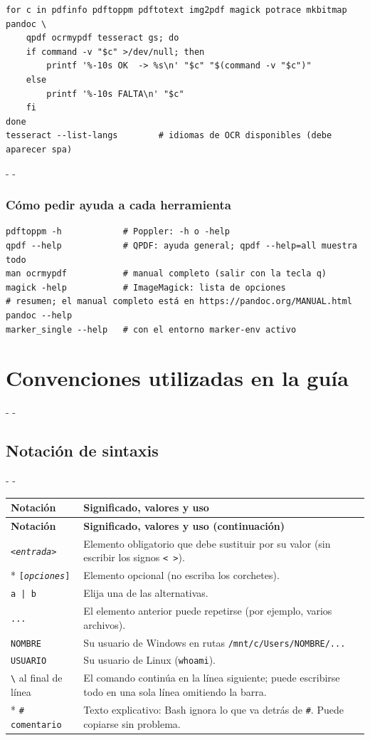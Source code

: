 \documentclass[11pt,a4paper]{article}
\makeatletter
\newcommand{\necesitaespacio}[1]{\par\penalty-100\begingroup
	\setlength{\dimen@}{#1}\dimen@ii\pagegoal\advance\dimen@ii-\pagetotal
	\ifdim\dimen@>\dimen@ii\ifdim\dimen@ii>\z@\vfil\fi\penalty-\@M\fi\endgroup}
\newenvironment{opciones}[1][Opción]{%
	\par\begingroup\small
	\begin{longtable}{L{4.25cm}L{11.2cm}}
		\toprule\rowcolor{tablacab}\cab{#1} & \cab{Significado, valores y uso} \\ \midrule
		\endfirsthead
		\toprule\rowcolor{tablacab}\cab{#1} & \cab{Significado, valores y uso (continuación)} \\ \midrule
		\endhead
		\bottomrule
		\endfoot}
	{\end{longtable}\endgroup}
\newcommand{\cmd}[1]{\texttt{\textcolor{colcmd}{#1}}}      %
\newcommand{\arch}[1]{\texttt{\textcolor{colarch}{#1}}}    %
\newcommand{\oblig}[1]{\texttt{<\textit{#1}>}}             %
\newcommand{\opcional}[1]{\texttt{[\textit{#1}]}}          %
\newcommand{\cab}[1]{\textbf{#1}}
\newcommand{\bs}{\textbackslash{}}    %
\makeatother
\begin{document}
	\begin{lstlisting}
for c in pdfinfo pdftoppm pdftotext img2pdf magick potrace mkbitmap pandoc \
    qpdf ocrmypdf tesseract gs; do
    if command -v "$c" >/dev/null; then
        printf '%-10s OK  -> %s\n' "$c" "$(command -v "$c")"
    else
        printf '%-10s FALTA\n' "$c"
    fi
done
tesseract --list-langs        # idiomas de OCR disponibles (debe aparecer spa)
\end{lstlisting}
	
	\necesitaespacio{6\baselineskip}
	\subsubsection{Cómo pedir ayuda a cada herramienta}
	
	\begin{lstlisting}
pdftoppm -h            # Poppler: -h o -help
qpdf --help            # QPDF: ayuda general; qpdf --help=all muestra todo
man ocrmypdf           # manual completo (salir con la tecla q)
magick -help           # ImageMagick: lista de opciones
# resumen; el manual completo está en https://pandoc.org/MANUAL.html
pandoc --help
marker_single --help   # con el entorno marker-env activo
\end{lstlisting}
	
	\clearpage
	\section{Convenciones utilizadas en la guía}\label{sec:convenciones}
	
	\necesitaespacio{24\baselineskip}
	\subsection{Notación de sintaxis}
	
	\necesitaespacio{20\baselineskip}
	\begin{opciones}[Notación]
		\oblig{entrada} & Elemento obligatorio que debe sustituir por su valor (sin escribir los signos \texttt{< >}).\\*
		\opcional{opciones} & Elemento opcional (no escriba los corchetes).\\
		\texttt{a | b} & Elija una de las alternativas.\\
		\texttt{...} & El elemento anterior puede repetirse (por ejemplo, varios archivos).\\
		\texttt{NOMBRE} & Su usuario de Windows en rutas \arch{/\allowbreak{}mnt/\allowbreak{}c/\allowbreak{}Users/\allowbreak{}NOMBRE/\allowbreak{}...}\\
		\texttt{USUARIO} & Su usuario de Linux (\cmd{whoami}).\\
		\texttt{\bs} al final de línea & El comando continúa en la línea siguiente; puede escribirse todo en una sola línea omitiendo la barra.\\*
		\texttt{\# comentario} & Texto explicativo: Bash ignora lo que va detrás de \texttt{\#}. Puede copiarse sin problema.\\
	\end{opciones}
	
\end{document}
